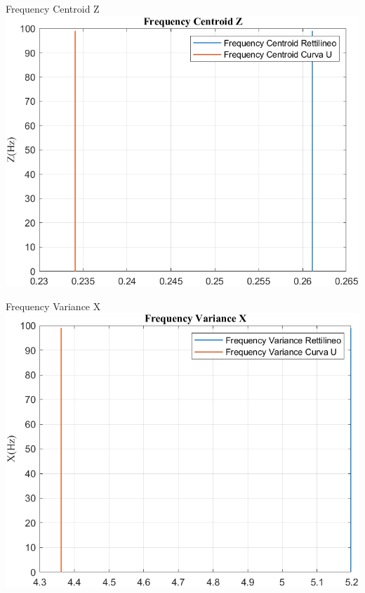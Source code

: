 \documentclass[beamer]{standalone}
\begin{document}
	\begin{frame}{{Frequency Centroid Z}}
		\centering\includegraphics[height=.8\textheight]{figure/Mag/Trasformata/Frequency CentroidZ}
	\end{frame}
	
	\begin{frame}{{Frequency Variance X}}
		\centering\includegraphics[height=.8\textheight]{figure/Mag/Trasformata/Frequency VarianceX}
	\end{frame}
	
\end{document}
